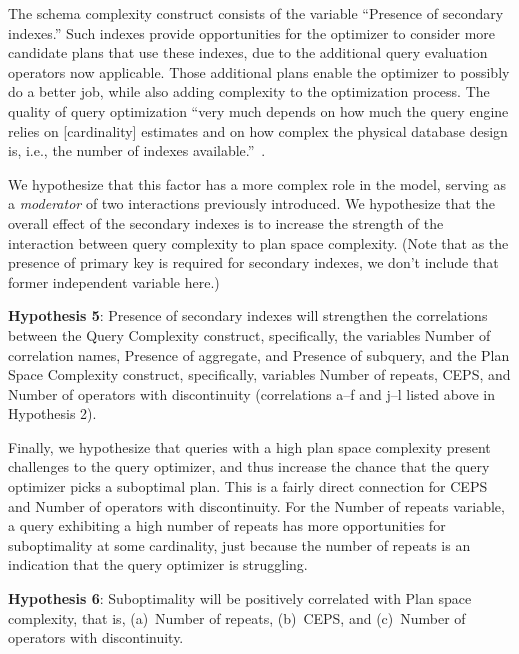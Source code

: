 \documentclass[prodmode,acmtods]{acmsmall}
\begin{document}
\vspace{0.6em}
The schema complexity construct consists of the variable ``Presence of
secondary indexes.'' Such indexes provide opportunities for the optimizer to
consider more candidate plans that use these indexes, due to the additional
query evaluation operators now applicable. Those additional plans enable the optimizer to
possibly do a better job, while also adding complexity to the optimization
process.  The quality of query optimization ``very much depends on how much
the query engine relies on [cardinality] estimates and on how complex the
physical database design is, i.e., the number of indexes
available.''~\cite{Leis15}.

We hypothesize that this factor has a more complex role in the
model, serving as a {\em moderator} of two interactions previously
introduced. We hypothesize that the overall effect of the secondary indexes
is to increase the strength of the interaction between query
complexity to plan space complexity. (Note that as the presence of primary
key is required for secondary indexes, we don't include that former
independent variable here.)

\vspace{0.6em}\noindent
{\bf Hypothesis 5}: Presence of secondary indexes will strengthen
the correlations between the Query Complexity construct, specifically, the
variables Number of
correlation names, Presence of aggregate, and Presence of subquery, and
the Plan Space Complexity construct, specifically, variables Number of repeats, CEPS, and Number
of operators with discontinuity (correlations a--f and j--l listed above in
Hypothesis 2).

\vspace{0.6em}
Finally, we hypothesize that queries with a high plan space complexity
present challenges to the query optimizer, and thus increase the chance that
the query optimizer picks a suboptimal plan. This is a fairly direct
connection for CEPS and Number of operators with discontinuity. For the
Number of repeats variable, a query exhibiting a high number of repeats has
more opportunities for suboptimality at some cardinality, just because the
number of repeats is an indication that the query optimizer is struggling.

\vspace{0.6em}\noindent
{\bf Hypothesis 6}: Suboptimality will be positively correlated with Plan
space complexity, that is, (a)~Number of repeats, (b)~CEPS, and (c)~Number
of operators with discontinuity.
\end{document}
